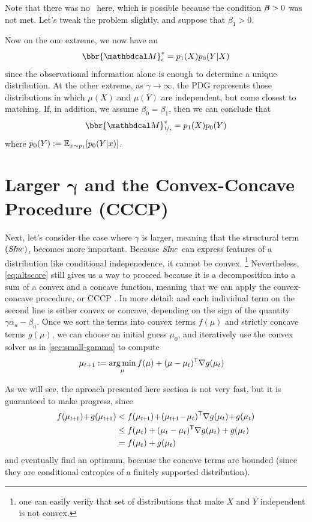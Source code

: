 Note that there was no \obslimit\ here, which is possible 
because the condition $\boldsymbol\beta > 0$ was not met.  Let's tweak the problem slightly, 
and suppose that $\beta_1 > 0$.

Now on the one extreme, we now have an \obslimit\
\[
    \bbr{\dg M}^*_{\epsilon} = p_1(X) p_0(Y|X)
\]
since the observational information alone is enough to determine a unique distribution.
At the other extreme, as $\gamma \to \infty$, the PDG represents those distributions 
in which $\mu(X)$ and $\mu(Y)$ are independent, but come closest to matching.
If, in addition, we assume $\beta_0 = \beta_1$, then we can conclude that
\[
    \bbr{\dg M}^*_{\nf1\epsilon} = p_1(X) p_0(Y) 
\]
where $p_0(Y) := \operatorname*{\mathbb{E}}_{x \sim p_1}[ p_0(Y|x) ]$.


\section{Larger
    \texorpdfstring{$\boldsymbol\gamma$}{Gamma} and the Convex-Concave Procedure (CCCP)}
    \label{sec:larger-gamma}

Next, let's consider the case where $\gamma$ is
larger, meaning that the structural term $(\mathit{S\mskip-2.5muI\mskip-3.5mun\mskip-1.7muc}_{})$,
becomes more important.
Because $\mathit{S\mskip-2.5muI\mskip-3.5mun\mskip-1.7muc}_{}$ can express features of a distribution like conditional indepenedence,
it cannot be convex.%
    \footnote{one can easily verify that set of distributions that make $X$ and $Y$ independent is not convex.}
Nevertheless, \eqref{eq:altscore} still gives us a way to proceed because it is a decomposition into a sum of a convex and a concave function, meaning that we can apply the convex-concave procedure, or CCCP \parencite{yuille2003concave}.
In more detail: and each individual term on the second line is either convex or concave, depending on the sign of the quantity $\gamma \alpha_a - \beta_a$.
Once we sort the terms into convex terms $f(\mu)$ and strictly concave terms $g(\mu)$, we can choose an initial guess $\mu_0$, and iteratively use the convex solver as in \cref{sec:small-gamma} to compute
%
\begin{align*}
    \mu_{t+1} &:= \operatorname*{arg\,min}_{\mu} f(\mu) + (\mu - \mu_{t})^{\sf T}
        \nabla g(\mu_t)
\end{align*}

As we will see, the aproach presented here section is
not very fast, but it is guaranteed to make progress, since
\def\tplus1{{t\mskip-2mu+\mskip-2mu1}}
\begin{align*}
    f(\mu_\tplus1) \!+\! g(\mu_\tplus1) &<  f(\mu_\tplus1) \!+\! (\mu_\tplus1 \!-\! \mu_t)^{\sf T} \nabla g(\mu_t) \!+\! g(\mu_t)
        \\
    &\le  f(\mu_t) + (\mu_t - \mu_{t})^{\sf T}\nabla g(\mu_t)  + g(\mu_t)
    \\
&= f(\mu_t) + g(\mu_t)
\end{align*}
and eventually find an optimum, because the concave terms are bounded (since they are conditional entropies of a finitely supported distribution).

